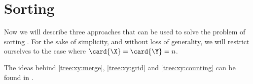\chapter{Sorting \XY}

Now we will describe three approaches that can be used to solve the problem
of sorting \XY. For the sake of simplicity, and without loss of generality,
we will restrict ourselves to the case where $\card{\X} = \card{\Y} = n$.

The ideas behind \ref{tree:xy:merge}, \ref{tree:xy:grid} and
\ref{tree:xy:counting} can be found in \citet*{harper:1975}.
